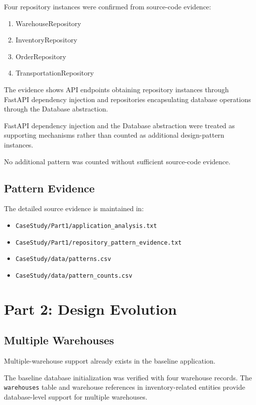 \documentclass[12pt,a4paper]{article}
\begin{document}
Four repository instances were confirmed from source-code evidence:

\begin{enumerate}
    \item WarehouseRepository
    \item InventoryRepository
    \item OrderRepository
    \item TransportationRepository
\end{enumerate}

The evidence shows API endpoints obtaining repository instances through FastAPI dependency injection and repositories encapsulating database operations through the Database abstraction.

FastAPI dependency injection and the Database abstraction were treated as supporting mechanisms rather than counted as additional design-pattern instances.

No additional pattern was counted without sufficient source-code evidence.

\subsection{Pattern Evidence}

The detailed source evidence is maintained in:

\begin{itemize}
    \item \texttt{CaseStudy/Part1/application\_analysis.txt}
    \item \texttt{CaseStudy/Part1/repository\_pattern\_evidence.txt}
    \item \texttt{CaseStudy/data/patterns.csv}
    \item \texttt{CaseStudy/data/pattern\_counts.csv}
\end{itemize}

\section{Part 2: Design Evolution}

\subsection{Multiple Warehouses}

Multiple-warehouse support already exists in the baseline application.

The baseline database initialization was verified with four warehouse records. The \texttt{warehouses} table and warehouse references in inventory-related entities provide database-level support for multiple warehouses.
\end{document}
